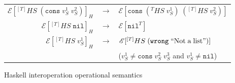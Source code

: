 \begin{figure}
\begin{center}
\begin{tabular}{rcl}
$\mathscr{E}[^{[T]}HS\;(\mathtt{cons}\;v_{S}^{1}\;v_{S}^{2})]_{H}$ & $\rightarrow$ & $\mathscr{E}[\mathtt{cons}\;(^{T}HS\;v_{S}^{1})\;(^{[T]}HS\;v_{S}^{2})]$ \\
$\mathscr{E}[^{[T]}HS\;\mathtt{nil}]_{H}$ & $\rightarrow$ & $\mathscr{E}[\mathtt{nil}^{T}]$ \\
$\mathscr{E}[^{[T]}HS\;v_{S}^{1}]_{H}$ & $\rightarrow$ & $\mathscr{E}[^{[T]}HS\;(\mathtt{wrong}\;\mathrm{``Not\;a\;list"})]$ \\
&& ($v_{S}^{1}\neq\mathtt{cons}\;v_{S}^{2}\;v_{S}^{3}$ and $v_{S}^{1}\neq\mathtt{nil}$)
\end{tabular}
\end{center}
\caption{Haskell interoperation operational semantics}
\label{fig:hios}
\end{figure}